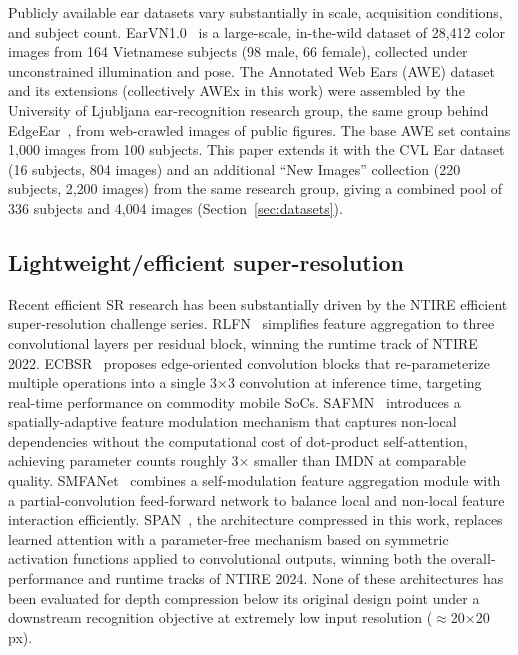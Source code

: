 \documentclass[11pt]{article}
\begin{document}
Publicly available ear datasets vary substantially in scale, acquisition conditions, and subject count. EarVN1.0~\cite{hoang2019earvn} is a large-scale, in-the-wild dataset of 28{,}412 color images from 164 Vietnamese subjects (98 male, 66 female), collected under unconstrained illumination and pose. The Annotated Web Ears (AWE) dataset~\cite{emersic2017ear} and its extensions (collectively AWEx in this work) were assembled by the University of Ljubljana ear-recognition research group, the same group behind EdgeEar~\cite{lendering2025edgeear}, from web-crawled images of public figures. The base AWE set contains 1{,}000 images from 100 subjects. This paper extends it with the CVL Ear dataset (16 subjects, 804 images) and an additional ``New Images'' collection (220 subjects, 2{,}200 images) from the same research group, giving a combined pool of 336 subjects and 4{,}004 images (Section~\ref{sec:datasets}).

\subsection{Lightweight/efficient super-resolution}
\label{sec:related-sr}

Recent efficient SR research has been substantially driven by the NTIRE efficient super-resolution challenge series. RLFN~\cite{kong2022rlfn} simplifies feature aggregation to three convolutional layers per residual block, winning the runtime track of NTIRE 2022. ECBSR~\cite{zhang2021ecbsr} proposes edge-oriented convolution blocks that re-parameterize multiple operations into a single 3$\times$3 convolution at inference time, targeting real-time performance on commodity mobile SoCs. SAFMN~\cite{sun2023safmn} introduces a spatially-adaptive feature modulation mechanism that captures non-local dependencies without the computational cost of dot-product self-attention, achieving parameter counts roughly 3$\times$ smaller than IMDN at comparable quality. SMFANet~\cite{zheng2024smfanet} combines a self-modulation feature aggregation module with a partial-convolution feed-forward network to balance local and non-local feature interaction efficiently. SPAN~\cite{wan2024span}, the architecture compressed in this work, replaces learned attention with a parameter-free mechanism based on symmetric activation functions applied to convolutional outputs, winning both the overall-performance and runtime tracks of NTIRE 2024. None of these architectures has been evaluated for depth compression below its original design point under a downstream recognition objective at extremely low input resolution ($\approx$20$\times$20\,px).
\end{document}
